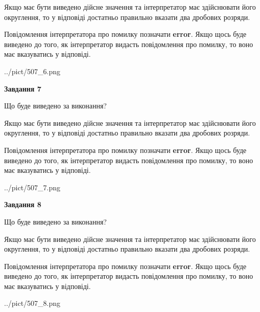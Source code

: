 \documentclass[12pt, ukrainian]{article}
\begin{document}
{\begin {Large}
Якщо має бути виведено дійсне значення та інтерпретатор має здійснювати його округлення, 
то у відповіді достатньо правильно вказати два дробових розряди.

Повідомлення інтерпретатора про помилку позначати \textbf{error}.
Якщо щось буде виведено до того, як інтерпретатор видасть повідомлення про помилку, 
то воно має вказуватись у відповіді. \par

\begin{center}
	{../pict/507_6.png}
\end{center}
\newpage

{\begin {center}\textbf{Завдання 7}\end {center}}\par
Що буде виведено за виконання? \par

Якщо має бути виведено дійсне значення та інтерпретатор має здійснювати його округлення, 
то у відповіді достатньо правильно вказати два дробових розряди.

Повідомлення інтерпретатора про помилку позначати \textbf{error}.
Якщо щось буде виведено до того, як інтерпретатор видасть повідомлення про помилку, 
то воно має вказуватись у відповіді. \par

\begin{center}
	{../pict/507_7.png}
\end{center}
\newpage

{\begin {center}\textbf{Завдання 8}\end {center}}\par
Що буде виведено за виконання? \par

Якщо має бути виведено дійсне значення та інтерпретатор має здійснювати його округлення, 
то у відповіді достатньо правильно вказати два дробових розряди.

Повідомлення інтерпретатора про помилку позначати \textbf{error}.
Якщо щось буде виведено до того, як інтерпретатор видасть повідомлення про помилку, 
то воно має вказуватись у відповіді. \par

\begin{center}
	{../pict/507_8.png}
\end{center}
\newpage


\end{Large}}
\end{document}
